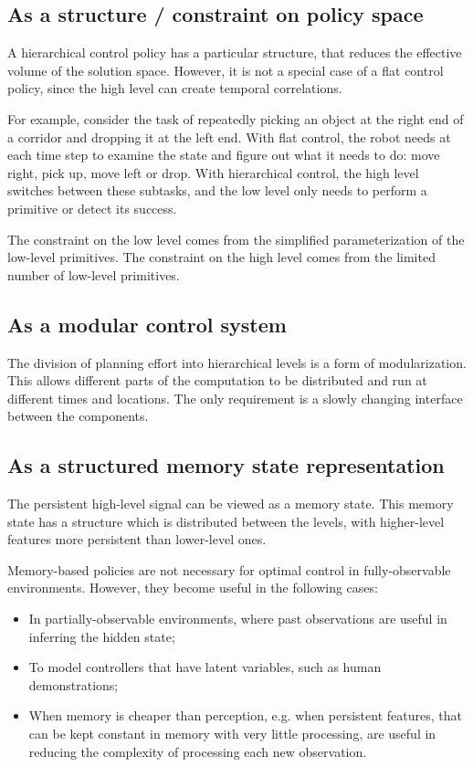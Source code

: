 \subsection{As a structure / constraint on policy space}

A hierarchical control policy has a particular structure, that reduces the effective volume of the solution space.
However, it is not a special case of a flat control policy, since the high level can create temporal correlations.

For example, consider the task of repeatedly picking an object at the right end of a corridor and dropping it at the left end.
With flat control, the robot needs at each time step to examine the state and figure out what it needs to do: move right, pick up, move left or drop.
With hierarchical control, the high level switches between these subtasks, and the low level only needs to perform a primitive or detect its success.

The constraint on the low level comes from the simplified parameterization of the low-level primitives.
The constraint on the high level comes from the limited number of low-level primitives.

\subsection{As a modular control system}

The division of planning effort into hierarchical levels is a form of modularization.
This allows different parts of the computation to be distributed and run at different times and locations.
The only requirement is a slowly changing interface between the components.

\subsection{As a structured memory state representation}

The persistent high-level signal can be viewed as a memory state.
This memory state has a structure which is distributed between the levels, with higher-level features more persistent than lower-level ones.

Memory-based policies are not necessary for optimal control in fully-observable environments.
However, they become useful in the following cases:

\begin{itemize}
	\item In partially-observable environments, where past observations are useful in inferring the hidden state;
	\item To model controllers that have latent variables, such as human demonstrations;
	\item When memory is cheaper than perception, e.g. when persistent features, that can be kept constant in memory with very little processing, are useful in reducing the complexity of processing each new observation.
\end{itemize}

